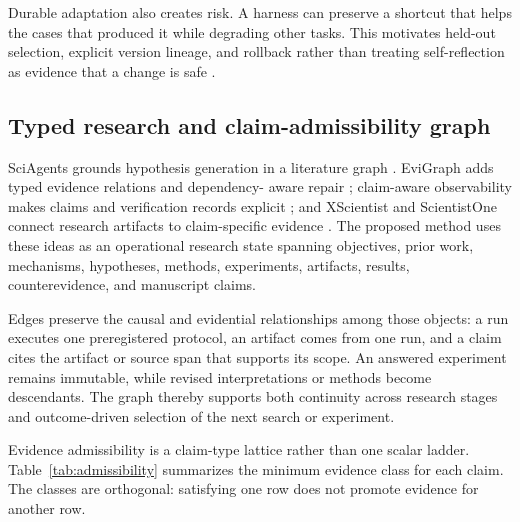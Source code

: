 \documentclass[11pt,a4paper]{article}
\begin{document}
Durable adaptation also creates risk.  A harness can preserve a shortcut that
helps the cases that produced it while degrading other tasks.  This motivates
held-out selection, explicit version lineage, and rollback rather than treating
self-reflection as evidence that a change is safe
\citep{rsea2026,regimes2026,autogenesis2026}.

\subsection{Typed research and claim-admissibility graph}

SciAgents grounds hypothesis generation in a literature graph
\citep{sciagents2024}.  EviGraph adds typed evidence relations and dependency-
aware repair \citep{evigraph2026}; claim-aware observability makes claims and
verification records explicit \citep{claimobservability2026}; and XScientist and
ScientistOne connect research artifacts to claim-specific evidence
\citep{xscientist2026,scientistone2026}.  The proposed method uses these ideas as an operational
research state spanning objectives, prior work, mechanisms, hypotheses, methods,
experiments, artifacts, results, counterevidence, and manuscript claims.

Edges preserve the causal and evidential relationships among those objects: a
run executes one preregistered protocol, an artifact comes from one run, and a
claim cites the artifact or source span that supports its scope.  An answered
experiment remains immutable, while revised interpretations or methods become
descendants.  The graph thereby supports both continuity across research stages
and outcome-driven selection of the next search or experiment.

Evidence admissibility is a claim-type lattice rather than one scalar ladder.
Table~\ref{tab:admissibility} summarizes the minimum evidence class for each
claim.  The classes are orthogonal: satisfying one row does not promote evidence
for another row.
\end{document}
